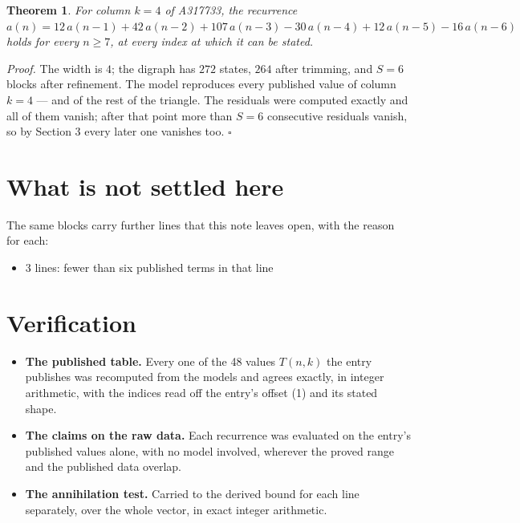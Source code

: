 \documentclass[11pt]{article}
\newtheorem{theorem}{Theorem}
\theoremstyle{definition}
\begin{document}
\begin{theorem} For column $k = 4$ of A317733, the recurrence $a(n) = 12\,a(n-1) + 42\,a(n-2) + 107\,a(n-3) - 30\,a(n-4) + 12\,a(n-5) - 16\,a(n-6)$ holds for every $n \ge 7$, at every index at which it can be stated.\end{theorem}

{\itshape Proof.} The width is $4$; the digraph has $272$ states, $264$ after trimming, and $S = 6$ blocks after refinement. The model reproduces every published value of column $k = 4$ --- and of the rest of the triangle. The residuals were computed exactly and all of them vanish; after that point more than $S = 6$ consecutive residuals vanish, so by Section 3 every later one vanishes too. $\square$

\section{What is not settled here}

The same blocks carry further lines that this note leaves open, with the reason for each:

\begin{itemize}

\item 3 lines: fewer than six published terms in that line

\end{itemize}

\section{Verification}

\begin{itemize}

\item {\bfseries The published table.} Every one of the 48 values $T(n,k)$ the entry publishes was recomputed from the models and agrees exactly, in integer arithmetic, with the indices read off the entry's offset (1) and its stated shape.

\item {\bfseries The claims on the raw data.} Each recurrence was evaluated on the entry's published values alone, with no model involved, wherever the proved range and the published data overlap.

\item {\bfseries The annihilation test.} Carried to the derived bound for each line separately, over the whole vector, in exact integer arithmetic.

\end{itemize}
\end{document}
